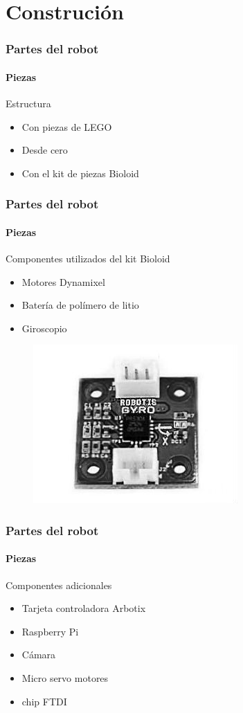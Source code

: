 \documentclass{beamer}
\begin{document}
  

\section{Construci\'on }
\begin{frame}
  \frametitle{Partes del robot}
  \framesubtitle{Piezas}

\begin{block}{Estructura}
	\begin{itemize}
		\item Con piezas de LEGO
		\item Desde cero
		\item Con el kit de piezas Bioloid
	\end{itemize}
\end{block}

 
\end{frame}

\begin{frame}
 \frametitle{Partes del robot}
 \framesubtitle{Piezas}
 
\begin{block}{Componentes utilizados del kit Bioloid}
\begin{itemize}
\item Motores Dynamixel
\item Bater\'ia de pol\'imero de litio
\item Giroscopio 
\end{itemize}
\end{block}

\begin{figure}[hbtp]
\centering
\includegraphics[scale=0.3]{gyro.jpg} 
\end{figure}

\end{frame}

\begin{frame}
 \frametitle{Partes del robot}
 \framesubtitle{Piezas}
 
\begin{block}{Componentes adicionales}
\begin{itemize}
\item Tarjeta controladora Arbotix
\item Raspberry Pi
\item C\'amara
\item Micro servo motores 
\item chip FTDI
\end{itemize}
\end{block}
\end{frame}
\end{document}
